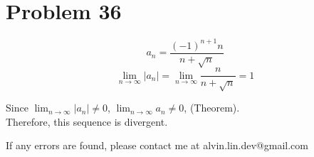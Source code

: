 \documentclass[letterpaper, 12pt]{math}
\begin{document}
\section*{Problem 36}
\[ a_{n} = \frac{(-1)^{n+1}n}{n+\sqrt{n}} \]
\[ \lim_{n\to\infty}{|a_{n}|} = \lim_{n\to\infty}{\frac{n}{n+\sqrt{n}}} = 1 \]
\begin{center}
  Since \( \lim_{n\to\infty}{|a_{n}|} \neq 0 \),
  \( \lim_{n\to\infty}{a_{n}} \neq 0 \), (Theorem). \\
  Therefore, this sequence is divergent.
\end{center}

\begin{center}
  If any errors are found, please contact me at alvin.lin.dev@gmail.com
\end{center}
\end{document}
